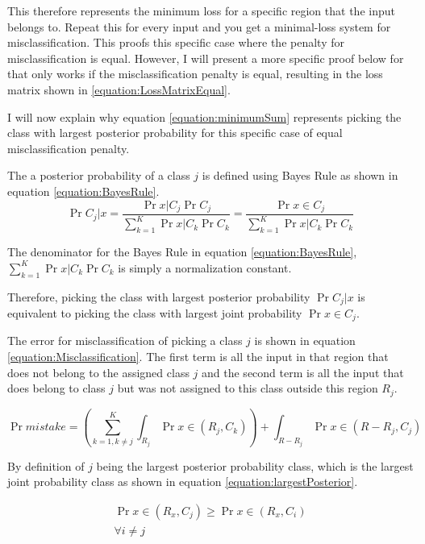 \documentclass[a4paper,12pt]{article}
\begin{document}
This therefore represents the minimum loss for a specific region that the input belongs to. Repeat this for every input and you get a minimal-loss system for misclassification. This proofs this specific case where the penalty for misclassification is equal. However, I will present a more specific proof below for that only works if the misclassification penalty is equal, resulting in the loss matrix shown in \ref{equation:LossMatrixEqual}. 

I will now explain why equation \ref{equation:minimumSum} represents picking the class with largest posterior probability for this specific case of equal misclassification penalty. 

The a posterior probability of a class $j$ is defined using Bayes Rule as shown in equation \ref{equation:BayesRule}.
\begin{equation}
\label{equation:BayesRule}
\Pr{C_{j} | x} = \frac{\Pr{x | C_{j}} \Pr{C_{j}}}{\sum_{k=1}^{K}  \Pr{x | C_{k}} \Pr{C_{k}}} = 
\frac{\Pr{x \in C_{j}}}{\sum_{k=1}^{K}  \Pr{x | C_{k}} \Pr{C_{k}}}
\end{equation}

The denominator for the Bayes Rule in equation \ref{equation:BayesRule}, 
$\sum_{k=1}^{K}  \Pr{x | C_{k}} \Pr{C_{k}}$ is simply a normalization constant. 

Therefore, picking the class with largest posterior probability $\Pr{C_{j} | x}$ is equivalent to picking the class with largest joint probability $\Pr{x \in C_{j}}$. 

The error for misclassification of picking a class $j$ is shown in equation \ref{equation:Misclassification}. 
The first term is all the input in that region that does not belong to the assigned class $j$ and the second term is all the input that does belong to class $j$ but was not assigned to this class outside this region $R_{j}$. 

\begin{equation}
\label{equation:Misclassification}
\Pr{mistake} = (\sum_{k=1, k \neq j}^{K} \int_{R_{j}} \Pr{x \in (R_{j}, C_{k})})  + \int_{R - R_{j}} \Pr{x \in (R -R_{j}, C_{j})}
\end{equation}

By definition of $j$ being the largest posterior probability class, which is the largest joint probability class as shown in equation \ref{equation:largestPosterior}. 

\begin{equation}
\begin{split}
\label{equation:largestPosterior}
\Pr{x \in (R_{x}, C_{j})} \ge  \Pr{x \in (R_{x}, C_{i})} \\
\forall i \neq j
\end{split}
\end{equation}
\end{document}

